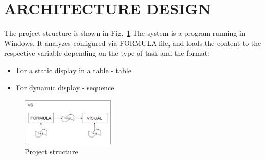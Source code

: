 \documentclass[a4paper, 10pt, conference]{ieeeconf}
\begin{document}
\section{ARCHITECTURE DESIGN}

The project structure is shown in Fig.~\ref{fig:structure}
The system is a program running in Windows. It analyzes configured via FORMULA file, and loads the content to the respective variable depending on the type of task and the format:
\begin{itemize}
\item For a static display in a table - table
\item For dynamic display - sequence
\end{itemize}
\begin{figure}[h]
    \centering
    \includegraphics[width=0.4\textwidth]{structure.png}
    \caption{Project structure}
    \label{fig:structure}
\end{figure}
\end{document}
